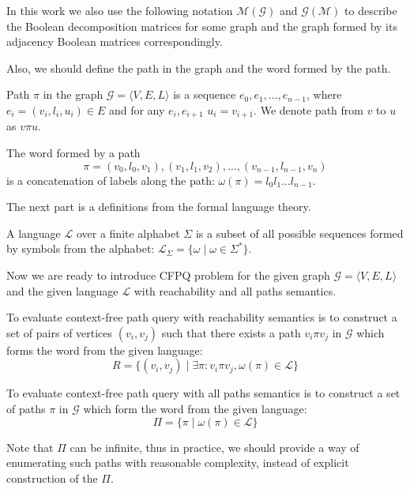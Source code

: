 In this work we also use the following notation $\mathcal{M}(\mathcal{G})$ and 
$\mathcal{G}(\mathcal{M})$ to describe the Boolean decomposition matrices for some graph 
and the graph formed by its adjacency Boolean matrices correspondingly.

Also, we should define the path in the graph and the word formed by the path.

\begin{definition}
Path $\pi$ in the graph $\mathcal{G} = \langle V,E,L \rangle$ is a sequence $e_0,e_1,\ldots,e_{n-1}$, where $e_i = (v_i,l_i,u_i) \in E$ and for any $e_i, e_{i+1}$ $u_i = v_{i+1}$. We denote path from $v$ to $u$ as $v\pi u$.   
\end{definition}

\begin{definition}
The word formed by a path $$\pi = (v_0,l_0,v_1),(v_1,l_1,v_2),\ldots,(v_{n-1},l_{n-1},v_n)$$ is a concatenation of labels along the path: $\omega(\pi) = l_0 l_1 \ldots l_{n-1}$.
\end{definition}

The next part is a definitions from the formal language theory.
\begin{definition}
A language $\mathcal{L}$ over a finite alphabet $\Sigma$ is a subset of all possible sequences formed by symbols from the alphabet: $\mathcal{L}_{\Sigma} = \{\omega \mid \omega \in \Sigma^*\}$.
\end{definition}

Now we are ready to introduce CFPQ problem for the given graph  $\mathcal{G} = \langle V,E,L \rangle$ and the given language $\mathcal{L}$ with reachability and all paths semantics.

\begin{definition}
To evaluate context-free path query with reachability semantics is to construct a set of pairs of vertices $(v_i,v_j)$ such that there exists a path $v_i \pi v_j$ in $\mathcal{G}$ which forms the word from the given language:
$$
R = \{(v_i,v_j) \mid \exists \pi: v_i \pi v_j, \omega(\pi) \in \mathcal{L} \}
$$
\end{definition}

\begin{definition}
To evaluate context-free path query with all paths semantics is to construct a set of paths $\pi$ in $\mathcal{G}$ which form the word from the given language:
$$
\Pi = \{ \pi \mid \omega(\pi) \in \mathcal{L}\}
$$
\end{definition}

Note that $\Pi$ can be infinite, thus in practice, we should provide a way of enumerating such paths with reasonable complexity, instead of explicit construction of the $\Pi$.


